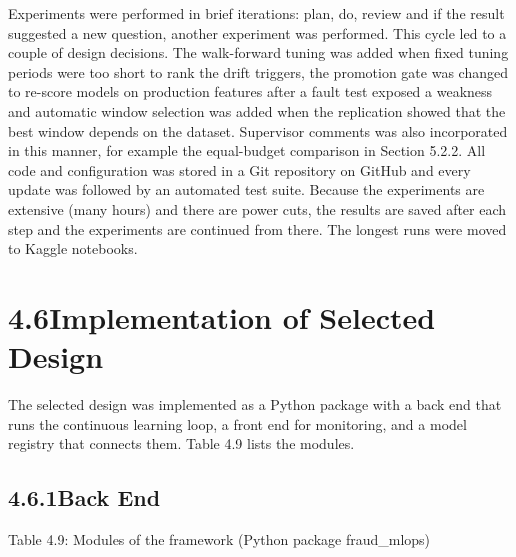 \documentclass[11pt,letterpaper]{report}
\begin{document}
Experiments were performed in brief iterations: plan, do, review and if the result suggested a new question, another experiment was performed. This cycle led to a couple of design decisions. The walk-forward tuning was added when fixed tuning periods were too short to rank the drift triggers, the promotion gate was changed to re-score models on production features after a fault test exposed a weakness and automatic window selection was added when the replication showed that the best window depends on the dataset. Supervisor comments was also incorporated in this manner, for example the equal-budget comparison in Section 5.2.2. All code and configuration was stored in a Git repository on GitHub and every update was followed by an automated test suite. Because the experiments are extensive (many hours) and there are power cuts, the results are saved after each step and the experiments are continued from there. The longest runs were moved to Kaggle notebooks.

\section*{4.6\quad Implementation of Selected Design}

The selected design was implemented as a Python package with a back end that runs the continuous learning loop, a front end for monitoring, and a model registry that connects them. Table 4.9 lists the modules.

\subsection*{4.6.1\quad Back End}

\begin{center}\small Table 4.9: Modules of the framework (Python package fraud\_mlops)\end{center}
\vspace{-1.2em}
\end{document}
